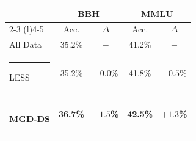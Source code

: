 
\begin{tabular}{@{}l*{2}{cc}@{}}
	\toprule
	& \multicolumn{2}{c}{\textbf{BBH} \citep{suzgun2022challenging}} & \multicolumn{2}{c}{\textbf{MMLU} \citep{hendrycks2020measuring}} \\
	\cmidrule(lr){2-3} \cmidrule(l){4-5}
	& Acc. & $\Delta$ & Acc. & $\Delta$ \\
	\midrule
	All Data & 35.2\% & $-$ & 41.2\% & $-$ \\
	\textcolor{pgfcolor1}{\rule{0.26cm}{0.26cm}} LESS & 35.2\% & \textcolor{myred}{$-0.0$\%} & 41.8\% & \textcolor{mygreen}{$+0.5$\%} \\
	\textcolor{pgfcolor0}{\rule{0.26cm}{0.26cm}} \textbf{MGD-DS} & \textbf{36.7\%} & \textbf{\textcolor{mygreen}{$\mathbf{+1.5}$\%}} & \textbf{42.5\%} & \textbf{\textcolor{mygreen}{$\mathbf{+1.3}$\%}} \\
	\bottomrule
\end{tabular}
